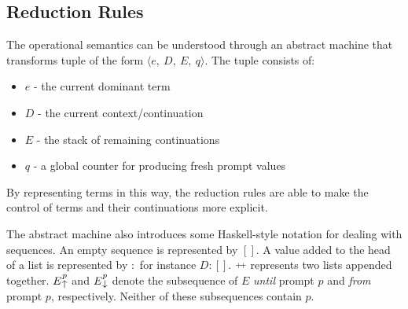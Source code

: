   \subsection{Reduction Rules}
  
  The operational semantics can be understood through an abstract machine that transforms tuple of the form $\langle e,\ D,\ E,\ q \rangle$.
  The tuple consists of:
    \begin{itemize}
      \item $e$ - the current dominant term
      \item $D$ - the current context/continuation
      \item $E$ - the stack of remaining continuations
      \item $q$ - a global counter for producing fresh prompt values
    \end{itemize}
  By representing terms in this way, 
  the reduction rules are able to make the control of terms and their continuations more explicit.
  
  The abstract machine also introduces some Haskell-style notation for dealing with sequences. An empty sequence is represented by $[]$. 
  A value added to the head of a list is represented by $:$ for instance $D:[]$. $\app$ represents two lists appended together. 
  $E\until{p}$ and $E\from{p}$ denote the subsequence of $E$ \emph{until} prompt $p$ and \emph{from} prompt $p$, respectively. 
  Neither of these subsequences contain $p$.

